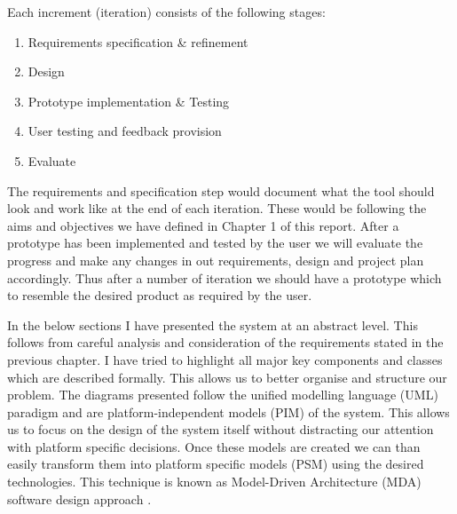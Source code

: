 Each increment (iteration) consists of the following stages:
\begin{enumerate}
	\item Requirements specification \& refinement
	\item Design
	\item Prototype implementation \& Testing
	\item User testing and feedback provision
	\item Evaluate
\end{enumerate}
The requirements and specification step would document what the tool should look and work like at the end of each iteration. These would be following the aims and objectives we have defined in Chapter 1 of this report. After a prototype has been implemented and tested by the user we will evaluate the progress and make any changes in out requirements, design and project plan accordingly. Thus after a number of iteration we should have a prototype which to resemble the desired product as required by the user.

In the below sections I have presented the system at an abstract level. This follows from careful analysis and consideration of the requirements stated in the previous chapter. I have tried to highlight all major key components and classes which are described formally. This allows us to better organise and structure our problem. The diagrams presented follow the unified modelling language (UML) paradigm \cite{uml} and are platform-independent models (PIM) of the system. This allows us to focus on the design of the system itself without distracting our attention with platform specific decisions. Once these models are created we can than easily transform them into platform specific models (PSM) using the desired technologies. This technique is known as Model-Driven Architecture (MDA) software design approach \cite{mda}.

